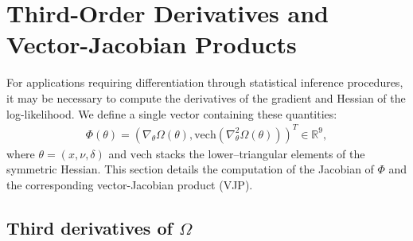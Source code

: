 \documentclass{article}
\begin{document}
\section{Third-Order Derivatives and Vector-Jacobian Products}

For applications requiring differentiation through statistical inference procedures, it may be necessary to compute the derivatives of the gradient and Hessian of the log-likelihood.
We define a single vector containing these quantities:
%
\begin{align}
  \Phi(\theta) = \left( \nabla_\theta \Omega(\theta), \mathrm{vech}(\nabla_\theta^2 \Omega(\theta)) \right)^T \in \mathbb{R}^9,
\end{align}
%
where $\theta = (x, \nu, \delta)$ and $\mathrm{vech}$ stacks the lower–triangular elements of the symmetric Hessian.
This section details the computation of the Jacobian of $\Phi$ and the corresponding vector-Jacobian product (VJP).

\subsection{Third derivatives of $\Omega$}
\end{document}
